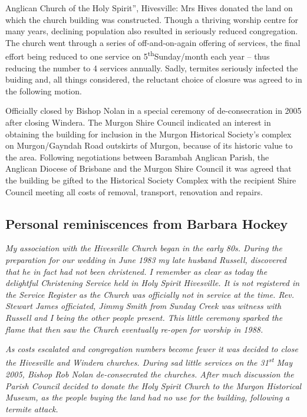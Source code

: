 Anglican Church of the Holy Spirit'', Hivesville: Mrs Hives donated the land on which the church building was constructed. Though a thriving worship centre for many years, declining population also resulted in seriously reduced congregation. The church went through a series of off-and-on-again offering of services, the final effort being reduced to one service on 5\textsuperscript{th}Sunday/month each year -- thus reducing the number to 4 services annually. Sadly, termites seriously infected the buiding and, all things considered, the reluctant choice of closure was agreed to in the following motion.



Officially closed by Bishop Nolan in a special ceremony of de-consecration in 2005 after closing Windera. The Murgon Shire Council indicated an interest in obtaining the building for inclusion in the Murgon Historical Society's complex on Murgon/Gayndah Road outskirts of Murgon, because of its historic value to the area. Following negotiations between Barambah Anglican Parish, the Anglican Diocese of Brisbane and the Murgon Shire Council it was agreed that the building be gifted to the Historical Society Complex with the recipient Shire Council meeting all costs of removal, transport, renovation and repairs.



\subsection{Personal reminiscences from Barbara Hockey}



\emph{My association with the Hivesville Church began in the early 80s. During the preparation for our wedding in June 1983 my late husband Russell, discovered that he in fact had not been christened. I remember as clear as today the delightful Christening Service held in Holy Spirit Hivesville. It is not registered in the Service Register as the Church was officially not in service at the time. Rev. Stewart James officiated, Jimmy Smith from Sunday Creek was witness with Russell and I being the other people present. This little ceremony sparked the flame that then saw the Church eventually re-open for worship in 1988.}



\emph{As costs escalated and congregation numbers become fewer it was decided to close the Hivesville and Windera churches. During sad little services on the 31\textsuperscript{st} May 2005, Bishop Rob Nolan de-consecrated the churches. After much discussion the Parish Council decided to donate the Holy Spirit Church to the Murgon Historical Museum, as the people buying the land had no use for the building, following a termite attack.}



